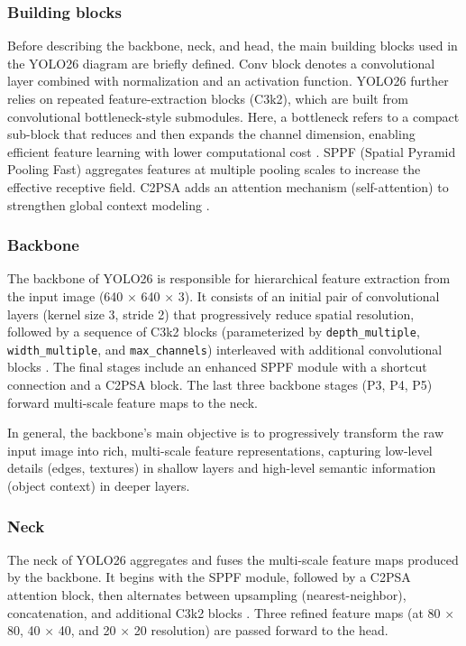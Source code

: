 \subsubsection*{Building blocks}
Before describing the backbone, neck, and head, the main building blocks used in the YOLO26 diagram are briefly defined. Conv block denotes a convolutional layer combined with normalization and an activation function. YOLO26 further relies on repeated feature-extraction blocks (C3k2), which are built from convolutional bottleneck-style submodules. Here, a bottleneck refers to a compact sub-block that reduces and then expands the channel dimension, enabling efficient feature learning with lower computational cost \citep{he2015deepresiduallearningimage}. SPPF (Spatial Pyramid Pooling Fast) aggregates features at multiple pooling scales to increase the effective receptive field. C2PSA adds an attention mechanism (self-attention) to strengthen global context modeling \citep{hidayatullah2026yolo26}.

\subsubsection*{Backbone}
The backbone of YOLO26 is responsible for hierarchical feature extraction from the input image (640 $\times$ 640 $\times$ 3). It consists of an initial pair of convolutional layers (kernel size 3, stride 2) that progressively reduce spatial resolution, followed by a sequence of C3k2 blocks (parameterized by \texttt{depth\_multiple}, \texttt{width\_multiple}, and \texttt{max\_channels}) interleaved with additional convolutional blocks \citep{hidayatullah2026yolo26}. The final stages include an enhanced SPPF module with a shortcut connection and a C2PSA block. The last three backbone stages (P3, P4, P5) forward multi-scale feature maps to the neck.

In general, the backbone's main objective is to progressively transform the raw input image into rich, multi-scale feature representations, capturing low-level details (edges, textures) in shallow layers and high-level semantic information (object context) in deeper layers.

\subsubsection*{Neck}
The neck of YOLO26 aggregates and fuses the multi-scale feature maps produced by the backbone. It begins with the SPPF module, followed by a C2PSA attention block, then alternates between upsampling (nearest-neighbor), concatenation, and additional C3k2 blocks \citep{hidayatullah2026yolo26}. Three refined feature maps (at 80 $\times$ 80, 40 $\times$ 40, and 20 $\times$ 20 resolution) are passed forward to the head.

